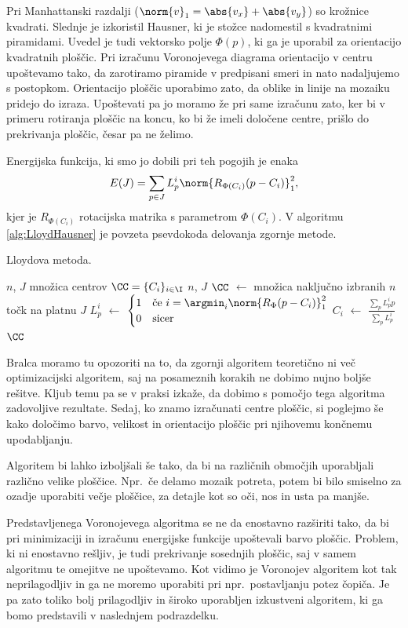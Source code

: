 Pri Manhattanski razdalji ($\norm{v}_1 = \abs{v_x} + \abs{v_y}$) so krožnice kvadrati. Slednje je izkoristil Hausner, ki je stožce nadomestil s kvadratnimi piramidami. Uvedel je tudi vektorsko polje $\Phi(p)$, ki ga je uporabil za orientacijo kvadratnih ploščic. Pri izračunu Voronojevega diagrama orientacijo v centru upoštevamo tako, da zarotiramo piramide v predpisani smeri in nato nadaljujemo s postopkom. Orientacijo ploščic uporabimo zato, da oblike in linije na mozaiku pridejo do izraza. Upoštevati pa jo moramo že pri same izračunu zato, ker bi v primeru rotiranja ploščic na koncu, ko bi že imeli določene centre, prišlo do prekrivanja ploščic, česar pa ne želimo.%

Energijska funkcija, ki smo jo dobili pri teh pogojih je enaka
%
\begin{align*}
E(J) = \sum_{p \in J} L_p^i \norm{R_{\Phi(C_i)} (p - C_i)}_1^2,
\end{align*}
%
kjer je $R_{\Phi(C_i)}$ rotacijska matrika s parametrom $\Phi(C_i)$. V algoritmu \ref{alg:LloydHausner} je povzeta psevdokoda delovanja zgornje metode.
%
%
\begin{algorithm}[htb]
  \caption{Lloydova metoda.}
  \label{alg:LloydHausner}
\begin{algorithmic}[1]
\Require $n$, $J$
\Ensure množica centrov $\CC = \{C_i\}_{i \in \I}$
 {$n$, $J$}
  \State $\CC$ $\gets$ množica naključno izbranih $n$ točk na platnu $J$
    \State $L_p^i$ $\gets$
             $\begin{cases}
               1 &\mbox{če } i = \argmin_i\norm{R_{\Phi}(p - C_i)}_1^2\\
               0 & \mbox{sicer}
              \end{cases}$
    \State $C_i$ $\gets$ $\frac{\sum_p L_p^i p}{\sum_p L_p^i}$
  \EndWhile
  \State \Return $\CC$
\EndFunction
\end{algorithmic}
\end{algorithm}
%

Bralca moramo tu opozoriti na to, da zgornji algoritem teoretično ni več optimizacijski algoritem, saj na posameznih korakih ne dobimo nujno boljše rešitve. %
Kljub temu pa se v praksi izkaže, da dobimo s pomočjo tega algoritma zadovoljive rezultate. Sedaj, ko znamo izračunati centre ploščic, si poglejmo še kako določimo barvo, velikost in orientacijo ploščic pri njihovemu  končnemu upodabljanju.
%
\begin{opomba}
Algoritem bi lahko izboljšali še tako, da bi na različnih območjih uporabljali različno velike ploščice. Npr.~če delamo mozaik potreta, potem bi bilo smiselno za ozadje uporabiti večje ploščice, za detajle kot so oči, nos in usta pa manjše. 
\end{opomba}
%
Predstavljenega Voronojevega algoritma se ne da enostavno razširiti tako, da bi pri minimizaciji in izračunu energijske funkcije upoštevali barvo ploščic. Problem, ki ni enostavno rešljiv, je tudi prekrivanje sosednjih ploščic, saj v samem algoritmu te omejitve ne upoštevamo. Kot vidimo je Voronojev algoritem kot tak neprilagodljiv in ga ne moremo uporabiti pri npr.~postavljanju potez čopiča. Je pa zato toliko bolj prilagodljiv in široko uporabljen izkustveni algoritem, ki ga bomo predstavili v naslednjem podrazdelku.
